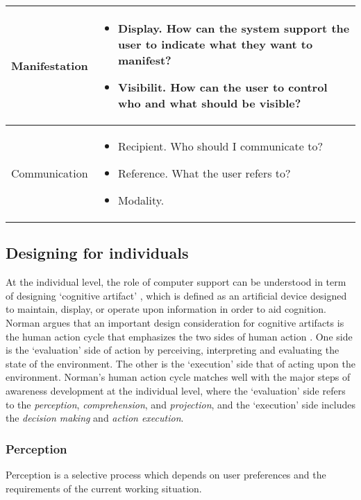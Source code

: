 \begin{longtable}{>{\raggedright}m{1.2in}>{\raggedright}p{4in}}
\tabularnewline
\midrule 
{\small Manifestation} & \begin{itemize}
\item {\small Display. How can the system support the user to indicate what
they want to manifest?}{\small \par}
\item {\small Visibilit. How can the user to control who and what should
be visible?}\end{itemize}
\tabularnewline
\midrule 
{\small Communication} & \begin{itemize}
\item {\small Recipient. Who should I communicate to?}{\small \par}
\item {\small Reference. What the user refers to?}{\small \par}
\item {\small Modality. }\end{itemize}
\tabularnewline
\bottomrule
\end{longtable}

\subsection{Designing for individuals} %
\label{sub:designing_for_individuals}
At the individual level, the role of computer support can be understood in term of designing `cognitive artifact' \cite{Norman1992}, which is defined as an artificial device designed to maintain, display, or operate upon information in order to aid cognition. Norman argues that an important design consideration for cognitive artifacts is the human action cycle that emphasizes the two sides of human action \cite{Norman1992}. One side is the `evaluation' side of action by perceiving, interpreting and evaluating the state of the environment. The other is the `execution' side that of acting upon the environment. Norman's human action cycle matches well with the major steps of awareness development at the individual level, where the `evaluation' side refers to the \emph{perception}, \emph{comprehension}, and \emph{projection}, and the `execution' side includes the \emph{decision making} and \emph{action execution}.

\subsubsection*{Perception} %
\label{ssub:perception}
Perception is a selective process which depends on user preferences and the requirements of the current working situation.

